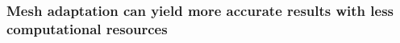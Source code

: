 \begin{frame}
  \frametitle{Mesh adaptation can yield more accurate
  results with less computational resources}
  \begin{columns}
    \begin{column}{0.6\textwidth}
\end{column}
\end{columns}
\end{frame}
